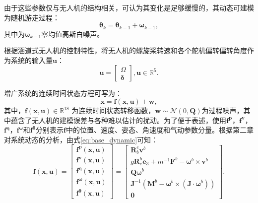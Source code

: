 由于这些参数仅与无人机的结构相关，可认为其变化是足够缓慢的，其动态可建模为随机游走过程：
\begin{equation}
    \boldsymbol{\theta}_{k} = \boldsymbol{\theta}_{k-1} + \boldsymbol{\omega}_{k-1},
\end{equation}
其中为$\boldsymbol{\omega}_{k-1}$零均值高斯白噪声。

根据涵道式无人机的控制特性，将无人机的螺旋桨转速和各个舵机偏转偏转角度作为系统的输入量$\boldsymbol{u}$：
\begin{equation}
    \boldsymbol{u} = 
    \begin{bmatrix}
        \Omega \\
        \boldsymbol{\delta}
    \end{bmatrix},
    \boldsymbol{u} \in \mathbb{R}^{5}.
\end{equation}

增广系统的连续时间状态方程可写为：
\begin{equation}
    \dot{\boldsymbol{x}} = \boldsymbol{f}(\boldsymbol{x}, \boldsymbol{u})+\boldsymbol{w},
\end{equation}
其中，$\boldsymbol{f}(\boldsymbol{x}, \boldsymbol{u}) \in \mathbb{R}^{18}$ 为连续时间状态转移函数，$\boldsymbol{w} \sim \mathcal{N}(0, \boldsymbol{Q})$为过程噪声，其中蕴含了无人机的建模误差与各种难以估计的扰动。为了便于表述，使用$\boldsymbol{f^p}$，$\boldsymbol{f^v}$，$\boldsymbol{f^{\eta}}$，$\boldsymbol{f^{\omega}}$和$\boldsymbol{f^{\theta}}$分别表示$\boldsymbol{f}$中的位置、速度、姿态、角速度和气动参数分量。根据第二章对系统动态的分析，由式\eqref{eq:base_dynamic}可知：
\begin{equation}
    \boldsymbol{f}(\boldsymbol{x}, \boldsymbol{u}) = 
    \begin{bmatrix}
        \boldsymbol{f^p}(\boldsymbol{x}, \boldsymbol{u}) \\
        \boldsymbol{f^v}(\boldsymbol{x}, \boldsymbol{u}) \\
        \boldsymbol{f^{\eta}}(\boldsymbol{x}, \boldsymbol{u}) \\
        \boldsymbol{f^{\omega}}(\boldsymbol{x}, \boldsymbol{u}) \\
        \boldsymbol{f^{\theta}}(\boldsymbol{x}, \boldsymbol{u})
    \end{bmatrix} =
    \begin{bmatrix}
        \boldsymbol{R}_b^e \boldsymbol{v}^b \\
        g\boldsymbol{R}_e^b \boldsymbol{e}_{3} +  m^{-1}\boldsymbol{F}^b - \boldsymbol{\omega}^b \times \boldsymbol{v}^b \\ 
        \boldsymbol{Q}\boldsymbol{\omega}^b \\
        \boldsymbol{J}^{-1}(\boldsymbol{M}^b - \boldsymbol{\omega}^b\times(\boldsymbol{J}\cdot\boldsymbol{\omega}^b)) \\
        \boldsymbol{0}
    \end{bmatrix}.
\end{equation}

